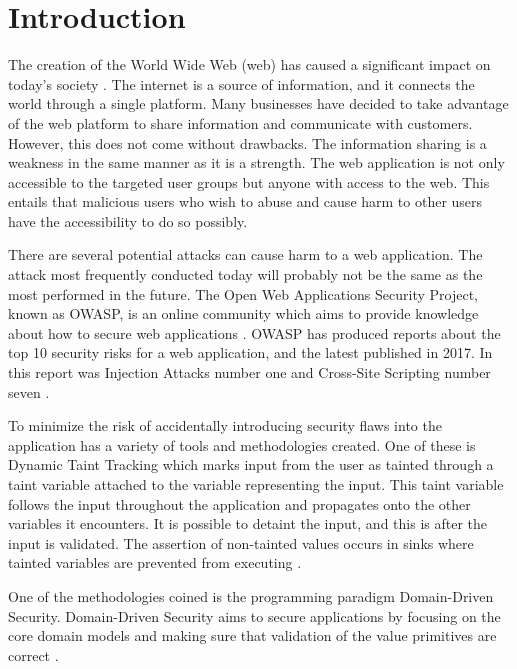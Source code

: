 \chapter{Introduction}
\label{Introduction}
The creation of the World Wide Web (web) has caused a significant impact on today's society \parencite{www}. The internet is a source of information, and it connects the world through a single platform. Many businesses have decided to take advantage of the web platform to share information and communicate with customers. However, this does not come without drawbacks. The information sharing is a weakness in the same manner as it is a strength. The web application is not only accessible to the targeted user groups but anyone with access to the web. This entails that malicious users who wish to abuse and cause harm to other users have the accessibility to do so possibly.

There are several potential attacks can cause harm to a web application. The attack most frequently conducted today will probably not be the same as the most performed in the future. The Open Web Applications Security Project, known as OWASP, is an online community which aims to provide knowledge about how to secure web applications \parencite{OpenWebApplicationSecurityProject}. OWASP has produced reports about the top 10 security risks for a web application, and the latest published in 2017. In this report was Injection Attacks number one and Cross-Site Scripting number seven \parencite{OWASP2017, OpenWebApplicationSecurityProject, CrossMichael2007Dgtw}.

To minimize the risk of accidentally introducing security flaws into the application has a variety of tools and methodologies created. One of these is Dynamic Taint Tracking which marks input from the user as tainted through a taint variable attached to the variable representing the input. This taint variable follows the input throughout the application and propagates onto the other variables it encounters. It is possible to detaint the input, and this is after the input is validated. The assertion of non-tainted values occurs in sinks where tainted variables are prevented from executing \parencite{Pan2015, Venkataramani2008}. 

One of the methodologies coined is the programming paradigm Domain-Driven Security. Domain-Driven Security aims to secure applications by focusing on the core domain models and making sure that validation of the value primitives are correct \parencite{Wilander2009, Johnsson2009}.

